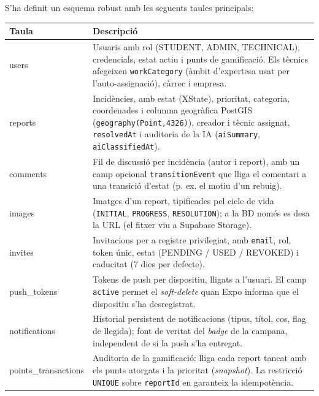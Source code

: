 \documentclass[10pt,a4paper,twocolumn,twoside]{article}
\begin{document}
		S'ha definit un esquema robust amb les seguents taules principals:
		
		\begin{table}[H]
			\centering
			\footnotesize
			\label{tab:bd}
			\begin{tabular}{|p{}|p{}|}
				\hline
				\textbf{Taula} & \textbf{Descripció} \\
				\hline
				users & Usuaris amb rol (STUDENT, ADMIN, TECHNICAL), credencials, estat actiu i punts de gamificació. Els tècnics afegeixen \texttt{workCategory} (àmbit d'expertesa usat per l'auto-assignació), càrrec i empresa. \\
				\hline
				reports & Incidències, amb estat (XState), prioritat, categoria, coordenades i columna geogràfica PostGIS (\texttt{geography(Point,4326)}), creador i tècnic assignat, \texttt{resolvedAt} i auditoria de la IA (\texttt{aiSummary}, \texttt{aiClassifiedAt}). \\
				\hline
				comments & Fil de discussió per incidència (autor i report), amb un camp opcional \texttt{transitionEvent} que lliga el comentari a una transició d'estat (p. ex. el motiu d'un rebuig). \\
				\hline
				images & Imatges d'un report, tipificades pel cicle de vida (\texttt{INITIAL}, \texttt{PROGRESS}, \texttt{RESOLUTION}); a la BD només es desa la URL (el fitxer viu a Supabase Storage). \\
				\hline
				invites & Invitacions per a registre privilegiat, amb \texttt{email}, rol, token únic, estat (PENDING / USED / REVOKED) i caducitat (7 dies per defecte). \\
				\hline
				push\_tokens & Tokens de push per dispositiu, lligats a l'usuari. El camp \texttt{active} permet el \textit{soft-delete} quan Expo informa que el dispositiu s'ha desregistrat. \\
				\hline
				notifications & Historial persistent de notificacions (tipus, títol, cos, flag de llegida); font de veritat del \textit{badge} de la campana, independent de si la push s'ha entregat. \\
				\hline
				points\_\-transactions & Auditoria de la gamificació: lliga cada report tancat amb els punts atorgats i la prioritat (\textit{snapshot}). La restricció \texttt{UNIQUE} sobre \texttt{reportId} en garanteix la idempotència. \\
				\hline
			\end{tabular}
		\end{table}
		
\end{document}
